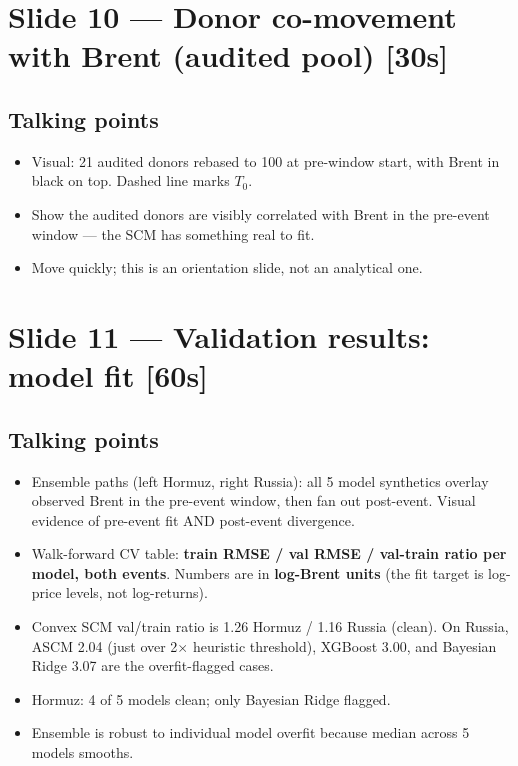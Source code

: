 \documentclass[11pt,a4paper]{article}
\newcommand{\timetag}[1]{\hfill\textcolor{muted}{\small[#1]}}
\newcommand{\highlight}[1]{\textcolor{accent}{\textbf{#1}}}
\begin{document}
\section{Slide 10 --- Donor co-movement with Brent (audited pool) \timetag{30s}}

\subsection{Talking points}
\begin{itemize}
  \item Visual: 21 audited donors rebased to 100 at pre-window start, with Brent in black on top. Dashed line marks $T_0$.
  \item Show the audited donors are visibly correlated with Brent in the pre-event window --- the SCM has something real to fit.
  \item Move quickly; this is an orientation slide, not an analytical one.
\end{itemize}

\section{Slide 11 --- Validation results: model fit \timetag{60s}}

\subsection{Talking points}
\begin{itemize}
  \item Ensemble paths (left Hormuz, right Russia): all 5 model synthetics overlay observed Brent in the pre-event window, then fan out post-event. Visual evidence of pre-event fit AND post-event divergence.
  \item Walk-forward CV table: \highlight{train RMSE / val RMSE / val-train ratio per model, both events}. Numbers are in \textbf{log-Brent units} (the fit target is log-price levels, not log-returns).
  \item Convex SCM val/train ratio is 1.26 Hormuz / 1.16 Russia (clean). On Russia, ASCM 2.04 (just over 2$\times$ heuristic threshold), XGBoost 3.00, and Bayesian Ridge 3.07 are the overfit-flagged cases.
  \item Hormuz: 4 of 5 models clean; only Bayesian Ridge flagged.
  \item Ensemble is robust to individual model overfit because median across 5 models smooths.
\end{itemize}
\end{document}
